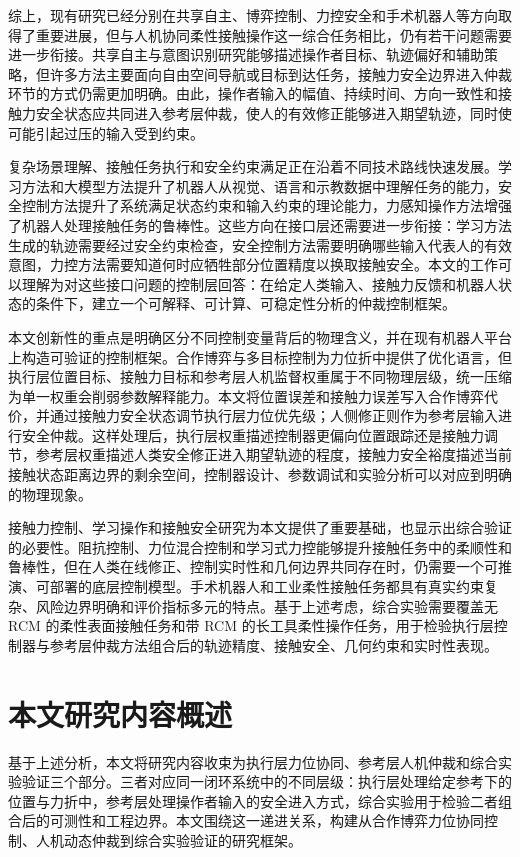综上，现有研究已经分别在共享自主、博弈控制、力控安全和手术机器人等方向取得了重要进展，但与人机协同柔性接触操作这一综合任务相比，仍有若干问题需要进一步衔接。共享自主与意图识别研究能够描述操作者目标、轨迹偏好和辅助策略，但许多方法主要面向自由空间导航或目标到达任务，接触力安全边界进入仲裁环节的方式仍需更加明确。由此，操作者输入的幅值、持续时间、方向一致性和接触力安全状态应共同进入参考层仲裁，使人的有效修正能够进入期望轨迹，同时使可能引起过压的输入受到约束。

复杂场景理解、接触任务执行和安全约束满足正在沿着不同技术路线快速发展。学习方法和大模型方法提升了机器人从视觉、语言和示教数据中理解任务的能力，安全控制方法提升了系统满足状态约束和输入约束的理论能力，力感知操作方法增强了机器人处理接触任务的鲁棒性。这些方向在接口层还需要进一步衔接：学习方法生成的轨迹需要经过安全约束检查，安全控制方法需要明确哪些输入代表人的有效意图，力控方法需要知道何时应牺牲部分位置精度以换取接触安全。本文的工作可以理解为对这些接口问题的控制层回答：在给定人类输入、接触力反馈和机器人状态的条件下，建立一个可解释、可计算、可稳定性分析的仲裁控制框架。

本文创新性的重点是明确区分不同控制变量背后的物理含义，并在现有机器人平台上构造可验证的控制框架。合作博弈与多目标控制为力位折中提供了优化语言，但执行层位置目标、接触力目标和参考层人机监督权重属于不同物理层级，统一压缩为单一权重会削弱参数解释能力。本文将位置误差和接触力误差写入合作博弈代价，并通过接触力安全状态调节执行层力位优先级；人侧修正则作为参考层输入进行安全仲裁。这样处理后，执行层权重描述控制器更偏向位置跟踪还是接触力调节，参考层权重描述人类安全修正进入期望轨迹的程度，接触力安全裕度描述当前接触状态距离边界的剩余空间，控制器设计、参数调试和实验分析可以对应到明确的物理现象。

接触力控制、学习操作和接触安全研究为本文提供了重要基础，也显示出综合验证的必要性。阻抗控制、力位混合控制和学习式力控能够提升接触任务中的柔顺性和鲁棒性，但在人类在线修正、控制实时性和几何边界共同存在时，仍需要一个可推演、可部署的底层控制模型。手术机器人和工业柔性接触任务都具有真实约束复杂、风险边界明确和评价指标多元的特点。基于上述考虑，综合实验需要覆盖无 RCM 的柔性表面接触任务和带 RCM 的长工具柔性操作任务，用于检验执行层控制器与参考层仲裁方法组合后的轨迹精度、接触安全、几何约束和实时性表现。

\section{本文研究内容概述}
\label{sec:ch1_contributions}

基于上述分析，本文将研究内容收束为执行层力位协同、参考层人机仲裁和综合实验验证三个部分。三者对应同一闭环系统中的不同层级：执行层处理给定参考下的位置与力折中，参考层处理操作者输入的安全进入方式，综合实验用于检验二者组合后的可测性和工程边界。本文围绕这一递进关系，构建从合作博弈力位协同控制、人机动态仲裁到综合实验验证的研究框架。


